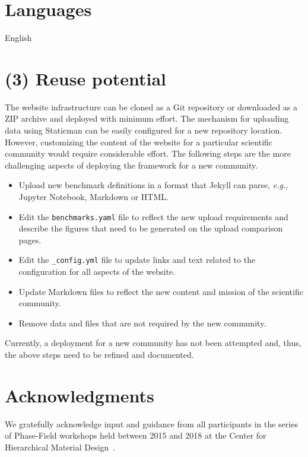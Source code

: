 \documentclass{jors}
\begin{document}
\section*{Languages}

English

\section*{(3) Reuse potential}

The website infrastructure can be cloned as a Git repository or
downloaded as a ZIP archive and deployed with minimum effort. The
mechanism for uploading data using Staticman can be easily configured
for a new repository location. However, customizing the content of the
website for a particular scientific community would require
considerable effort. The following steps are the more challenging
aspects of deploying the framework for a new community.

\begin{itemize}
  \item Upload new benchmark definitions in a format that Jekyll can
    parse, \emph{e.g.}, Jupyter Notebook, Markdown or HTML.
  \item Edit the \texttt{benchmarks.yaml} file to reflect the new
    upload requirements and describe the figures that need to be
    generated on the upload comparison pages.
  \item Edit the \texttt{\_config.yml} file to update links and text
    related to the configuration for all aspects of the website.
  \item Update Markdown files to reflect the new content and mission
    of the scientific community.
  \item Remove data and files that are not required by the new
    community.
\end{itemize}

Currently, a deployment for a new community has not been attempted
and, thus, the above steps need to be refined and documented.

\section*{Acknowledgments}

We gratefully acknowledge input and guidance from all participants in
the series of Phase-Field workshops held between 2015 and 2018 at the
Center for Hierarchical Material Design~\cite{workshops}.
\end{document}
